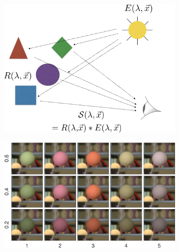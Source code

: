 \documentclass{jov}
\begin{document}
\begin{figure}
\centering
\begin{subfigure}{0.4 \textwidth}
		\centering
        \includegraphics[width=\textwidth]{../Figures/Figure1/Figure1_a.png}
        \caption{}
        \label{fig:introSchematic}
    \end{subfigure}
    \begin{subfigure}{0.45 \textwidth}   
        \includegraphics[width=\textwidth]{../Figures/Figure1/Figure1_b.jpeg}
        \caption{}
        \label{fig:introExampleFigure}
    \end{subfigure}
    \label{introFigure}

\end{figure}
\end{document}
